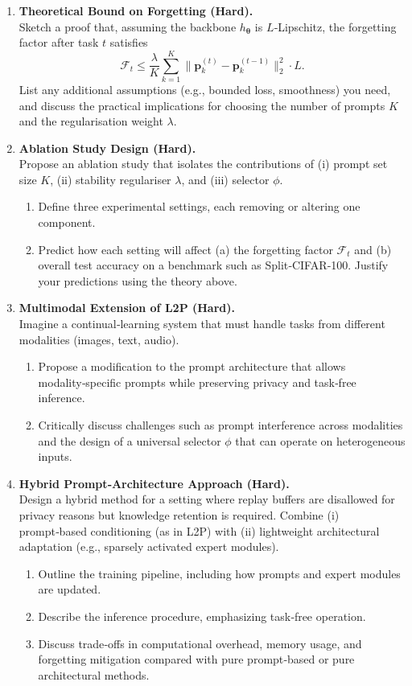 \documentclass[12pt, a4paper]{article}
\begin{document}
\begin{enumerate}
  \item \textbf{Theoretical Bound on Forgetting (Hard).}\\
  Sketch a proof that, assuming the backbone $h_{\boldsymbol\theta}$ is $L$‑Lipschitz, the forgetting factor after task $t$ satisfies
  \[
    \mathcal F_t \leq \frac{\lambda}{K}\sum_{k=1}^{K}\|\mathbf p_k^{(t)}-\mathbf p_k^{(t-1)}\|_2^2 \cdot L .
  \]
  List any additional assumptions (e.g., bounded loss, smoothness) you need, and discuss the practical implications for choosing the number of prompts $K$ and the regularisation weight $\lambda$.

  \item \textbf{Ablation Study Design (Hard).}\\
  Propose an ablation study that isolates the contributions of (i) prompt set size $K$, (ii) stability regulariser $\lambda$, and (iii) selector $\phi$.
  \begin{enumerate}
    \item Define three experimental settings, each removing or altering one component.
    \item Predict how each setting will affect (a) the forgetting factor $\mathcal F_t$ and (b) overall test accuracy on a benchmark such as Split‑CIFAR‑100. Justify your predictions using the theory above.
  \end{enumerate}

  \item \textbf{Multimodal Extension of L2P (Hard).}\\
  Imagine a continual‑learning system that must handle tasks from different modalities (images, text, audio). 
  \begin{enumerate}
    \item Propose a modification to the prompt architecture that allows modality‑specific prompts while preserving privacy and task‑free inference.
    \item Critically discuss challenges such as prompt interference across modalities and the design of a universal selector $\phi$ that can operate on heterogeneous inputs.
  \end{enumerate}

  \item \textbf{Hybrid Prompt‑Architecture Approach (Hard).}\\
  Design a hybrid method for a setting where replay buffers are disallowed for privacy reasons but knowledge retention is required. Combine (i) prompt‑based conditioning (as in L2P) with (ii) lightweight architectural adaptation (e.g., sparsely activated expert modules).
  \begin{enumerate}
    \item Outline the training pipeline, including how prompts and expert modules are updated.
    \item Describe the inference procedure, emphasizing task‑free operation.
    \item Discuss trade‑offs in computational overhead, memory usage, and forgetting mitigation compared with pure prompt‑based or pure architectural methods.
  \end{enumerate}
\end{enumerate}
\end{document}
